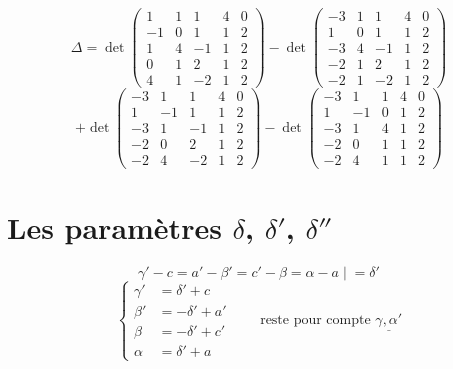 \documentclass[11pt,a4paper]{article}
\begin{document}
\[
\Delta = \det\begin{pmatrix}
1 & 1 & 1 & 4 & 0\\
-1 & 0 & 1 & 1 & 2\\
1 & 4 & -1 & 1 & 2\\
0 & 1 & 2 & 1 & 2\\
4 & 1 & -2 & 1 & 2
\end{pmatrix}
- \det\begin{pmatrix}
-3 & 1 & 1 & 4 & 0\\
1 & 0 & 1 & 1 & 2\\
-3 & 4 & -1 & 1 & 2\\
-2 & 1 & 2 & 1 & 2\\
-2 & 1 & -2 & 1 & 2
\end{pmatrix}
\]
\[
+ \det\begin{pmatrix}
-3 & 1 & 1 & 4 & 0\\
1 & -1 & 1 & 1 & 2\\
-3 & 1 & -1 & 1 & 2\\
-2 & 0 & 2 & 1 & 2\\
-2 & 4 & -2 & 1 & 2
\end{pmatrix}
- \det\begin{pmatrix}
-3 & 1 & 1 & 4 & 0\\
1 & -1 & 0 & 1 & 2\\
-3 & 1 & 4 & 1 & 2\\
-2 & 0 & 1 & 1 & 2\\
-2 & 4 & 1 & 1 & 2
\end{pmatrix}
\]

\section{Les paramètres $\delta$, $\delta'$, $\delta''$}


\[
\gamma' - c = a' - \beta' = c' - \beta = \alpha - a \;\Big|\; = \delta'
\]
\[
\left\{
\begin{aligned}
\gamma' &= \delta' + c\\
\beta' &= -\delta' + a'\\
\beta &= -\delta' + c'\\
\alpha &= \delta' + a
\end{aligned}
\right.
\qquad \text{reste pour compte } \underline{\gamma, \alpha'}
\]
\end{document}
